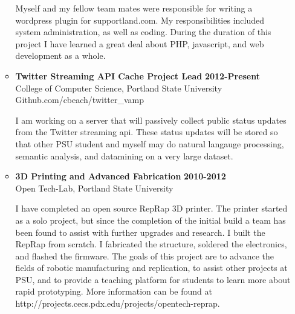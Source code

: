 \documentclass[overlapped]{res}
\begin{document}
\begin{resume}
\begin{itemize}[leftmargin=0in]
\begin{itemize}[leftmargin=0in]
\begin{samepage}
                    Myself and my fellow team mates were responsible for writing a wordpress plugin 
                    for supportland.com. My responsibilities included system administration, as 
                    well as coding. During the duration of this project I have learned a great
                    deal about PHP, javascript, and web development as a whole.
                \end{samepage}

            \item[] 
                \begin{samepage}

                    \textbf{Twitter Streaming API Cache Project Lead} \hfill \textbf{2012-Present} \\
                    College of Computer Science, Portland State University \\
                    Github.com/cbeach/twitter\_vamp 

                    I am working on a server that will passively collect public status updates from the
                    Twitter streaming api. These status updates will be stored so that other PSU student
                    and myself may do natural langauge processing, semantic analysis, and datamining on
                    a very large dataset.				
                \end{samepage}

            \item[] 
                \begin{samepage}

                    \textbf{3D Printing and Advanced Fabrication} \hfill \textbf{2010-2012} \\
                    Open Tech-Lab, Portland State University

                    I have completed an open source RepRap 3D printer. The printer started as a solo project, 
                    but since the completion of the initial build a team has been found to assist with further 
                    upgrades and research. I built the RepRap from scratch. I fabricated the structure, soldered  
                    the electronics, and flashed the firmware. 	The goals of this project are to advance the 
                    fields of robotic manufacturing and replication, to assist other projects at PSU, and to 
                    provide a teaching platform for students to learn more about rapid prototyping. 
                    More information can be found at http://projects.cecs.pdx.edu/projects/opentech-reprap. 
                \end{samepage}
        \end{itemize}
\end{itemize}
	

\end{resume}
\end{document}
